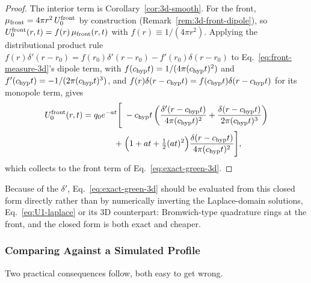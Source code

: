 \begin{proof}
The interior term is Corollary~\ref{cor:3d-smooth}. For the front,
$\mu_{\rm front}=4\pi r^2\,U_0^{\rm front}$ by construction
(Remark~\ref{rem:3d-front-dipole}), so $U_0^{\rm
front}(r,t)=f(r)\,\mu_{\rm front}(r,t)$ with $f(r)\equiv1/(4\pi r^2)$.
Applying the distributional product rule
$f(r)\delta'(r-r_0)=f(r_0)\delta'(r-r_0)-f'(r_0)\delta(r-r_0)$ to
Eq.~\eqref{eq:front-measure-3d}'s dipole term, with $f(c_{\rm hyp}
t)=1/(4\pi(c_{\rm hyp} t)^2)$ and $f'(c_{\rm hyp} t)=-1/(2\pi(c_{\rm hyp} t)^3)$, and
$f(r)\delta(r-c_{\rm hyp} t)=f(c_{\rm hyp} t)\delta(r-c_{\rm hyp} t)$ for its monopole term,
gives
\begin{equation}
  \begin{split}
    U_0^{\rm front}(r,t) = q_0e^{-at}\Bigg[\;
      &-c_{\rm hyp} t\left(\frac{\delta'(r-c_{\rm hyp} t)}{4\pi(c_{\rm hyp} t)^2}
        +\frac{\delta(r-c_{\rm hyp} t)}{2\pi(c_{\rm hyp} t)^3}\right) \\
      +\;&\Big(1+at+\tfrac12(at)^2\Big)\frac{\delta(r-c_{\rm hyp} t)}{4\pi(c_{\rm hyp} t)^2}
    \Bigg] ,
  \end{split}
\end{equation}
which collects to the front term of Eq.~\eqref{eq:exact-green-3d}.
\end{proof}

Because of the $\delta'$, Eq.~\eqref{eq:exact-green-3d} should be
evaluated from this closed form directly rather than by numerically
inverting the Laplace-domain solutions, Eq.~\eqref{eq:U1-laplace} or its
3D counterpart: Bromwich-type quadrature rings at the front, and the
closed form is both exact and cheaper.

\subsubsection{Comparing Against a Simulated Profile}
\label{sec:exact-comparison}

Two practical consequences follow, both easy to get wrong.

